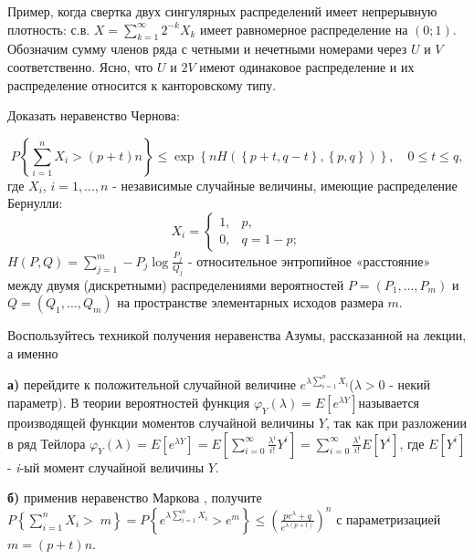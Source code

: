\begin{problem}
\begin{remark}
Пример, когда свертка двух сингулярных распределений имеет непрерывную плотность: с.в. $X=\sum _{k=1}^{\infty }2^{-k} X_{k}  $ имеет равномерное распределение на $\left(0;1\right)$. Обозначим сумму членов ряда с четными и нечетными номерами через $U$ и $V$ соответственно. Ясно, что $U$ и $2V$ имеют одинаковое распределение и их распределение относится к канторовскому типу.
\end{remark}

\end{problem}

\begin{problem}
Доказать неравенство Чернова:

\[P\left\{\sum _{i=1}^{n}X_{i} >(p+t)n \right\}\le \exp \left\{nH\left(\left\{p+t,q-t\right\},\left\{p,q\right\}\right)\right\},\quad 0\le t\le q,\] 
где $X_{i} $, $i=1,...,n$ - независимые случайные величины, имеющие распределение Бернулли:
\[X_{i} =\left\{\begin{array}{cc} {1,} & {p,} \\ {0,} & {q=1-p;} \end{array}\right. \] 
$H\left(P,Q\right)=\sum _{j=1}^{m}-P_{j} \log \frac{P_{j} }{Q_{j} }  $ - относительное энтропийное «расстояние» между двумя (дискретными) распределениями вероятностей $P=\left(P_{1} ,\ldots ,P_{m} \right)$ и $Q=\left(Q_{1} ,\ldots ,Q_{m} \right)$ на пространстве элементарных исходов размера $m$.

\begin{ordre}
 
Воспользуйтесь техникой получения неравенства Азумы, рассказанной на лекции, а именно 

\noindent \textbf{а)} перейдите к положительной случайной величине $e^{\lambda \sum _{i=1}^{n}X_{i}  } $($\lambda >0$ - некий параметр). В теории вероятностей функция $\varphi _{Y} (\lambda )=E\left[e^{\lambda Y} \right]$называется производящей функции моментов случайной величины $Y$, так как при разложении в ряд Тейлора $\varphi _{Y} (\lambda )=E\left[e^{\lambda Y} \right]=E\left[\sum _{i=0}^{\infty }\frac{\lambda ^{i} }{i!} Y^{i}  \right]=\sum _{i=0}^{\infty }\frac{\lambda ^{i} }{i!} E\left[Y^{i} \right] $, где $E\left[Y^{i} \right]$ - \textit{i}-ый момент случайной величины $Y$.

\noindent \textbf{б)} применив неравенство Маркова , получите $P\left\{\sum _{i=1}^{n}X_{i} > \; m\right\}=P\left\{e^{\lambda \sum _{i=1}^{n}X_{i}  } >e^{m} \right\}\le \left(\frac{pe^{\lambda } +q}{e^{\lambda (p+t)} } \right)^{n} $ с параметризацией $m=(p+t)n$.


\end{ordre}
\end{problem}
